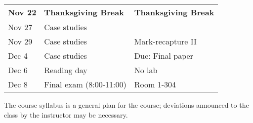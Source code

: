 \documentclass[12pt]{article}
\begin{document}
\begin{center}
\begin{tabular}[c]{lll}
Nov 22     & Thanksgiving Break                 & Thanksgiving Break                   \\
\hline
Nov 27     & Case studies                       &                                      \\
Nov 29     & Case studies                       & Mark-recapture II                    \\
\hline
Dec 4      & Case studies                       & Due: Final paper                     \\
Dec 6      & Reading day                        & No lab                               \\
\hline
Dec 8     & Final exam (8:00-11:00)            &  Room 1-304                                 \\
\hline \hline
\end{tabular}
\end{center}

The course syllabus is a general plan for the course; deviations announced to the class by the instructor may be necessary.
\end{document}

